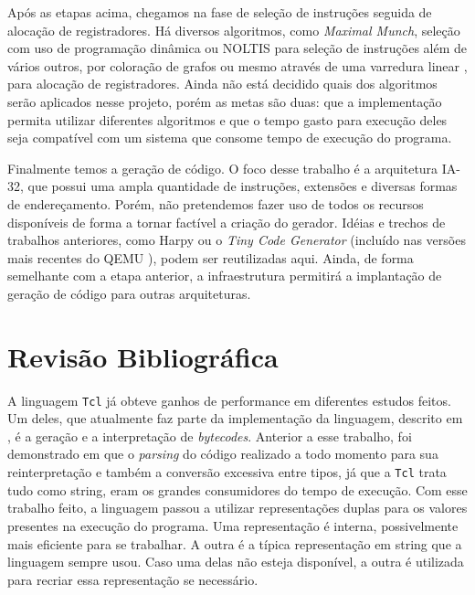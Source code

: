 Após as etapas acima, chegamos na fase de seleção de instruções
seguida de alocação de registradores. Há diversos algoritmos, como
\textit{Maximal Munch}, seleção com uso de programação dinâmica ou
NOLTIS \cite{noltis}  para seleção de instruções além de vários
outros, por coloração de grafos ou mesmo através de uma varredura
linear \cite{linear_scan_regalloc}, para alocação de registradores.
Ainda não está decidido quais dos algoritmos serão aplicados nesse
projeto, porém as metas são duas: que a implementação permita utilizar
diferentes algoritmos e que o tempo gasto para execução deles
seja compatível com um sistema que consome tempo de execução do programa.

Finalmente temos a geração de código. O foco desse trabalho é a
arquitetura IA-32, que possui uma ampla quantidade de instruções, extensões e
diversas formas de endereçamento. %
Porém, não pretendemos fazer uso de todos os recursos disponíveis de
forma a tornar factível a criação do gerador.
Idéias e trechos de trabalhos anteriores, como Harpy \cite{harpy}
ou o \textit{Tiny Code Generator} (incluído nas versões mais recentes do
QEMU \cite{qemu}), podem ser reutilizadas aqui.
Ainda, de forma semelhante com a etapa anterior, a infraestrutura
permitirá a implantação de geração de código para outras arquiteturas.


\section{Revisão Bibliográfica}

A linguagem \texttt{Tcl} já obteve ganhos de performance em diferentes
estudos feitos. Um deles, que atualmente faz parte da implementação da
linguagem, descrito em \cite{tcl_bytecode}, é a geração e a
interpretação de \textit{bytecodes}. Anterior a esse trabalho, foi
demonstrado em \cite{sah_tc} que o \textit{parsing} do código
realizado a todo momento para sua reinterpretação e também a conversão
excessiva entre tipos, já que a \texttt{Tcl} trata tudo como string,
eram os grandes consumidores do tempo de execução. Com esse trabalho
feito, a linguagem passou a utilizar representações duplas para os
valores presentes na execução do programa. Uma representação é
interna, possivelmente mais eficiente para se trabalhar. A outra é a
típica representação em string que a linguagem sempre usou. Caso uma
delas não esteja disponível, a outra é utilizada para recriar essa
representação se necessário.

